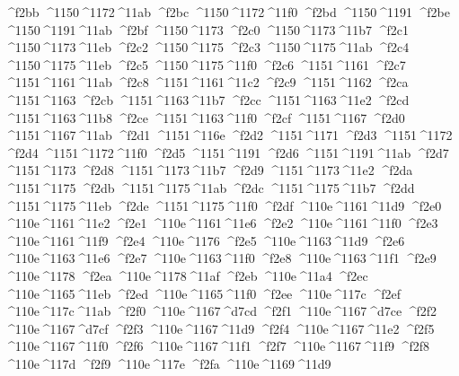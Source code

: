\checkit ^^^^f2bb ^^^^1150^^^^1172^^^^11ab
\checkit ^^^^f2bc ^^^^1150^^^^1172^^^^11f0
\checkit ^^^^f2bd ^^^^1150^^^^1191
\checkit ^^^^f2be ^^^^1150^^^^1191^^^^11ab
\checkit ^^^^f2bf ^^^^1150^^^^1173
\checkit ^^^^f2c0 ^^^^1150^^^^1173^^^^11b7
\checkit ^^^^f2c1 ^^^^1150^^^^1173^^^^11eb
\checkit ^^^^f2c2 ^^^^1150^^^^1175
\checkit ^^^^f2c3 ^^^^1150^^^^1175^^^^11ab
\checkit ^^^^f2c4 ^^^^1150^^^^1175^^^^11eb
\checkit ^^^^f2c5 ^^^^1150^^^^1175^^^^11f0
\checkit ^^^^f2c6 ^^^^1151^^^^1161
\checkit ^^^^f2c7 ^^^^1151^^^^1161^^^^11ab
\checkit ^^^^f2c8 ^^^^1151^^^^1161^^^^11c2
\checkit ^^^^f2c9 ^^^^1151^^^^1162
\checkit ^^^^f2ca ^^^^1151^^^^1163
\checkit ^^^^f2cb ^^^^1151^^^^1163^^^^11b7
\checkit ^^^^f2cc ^^^^1151^^^^1163^^^^11e2
\checkit ^^^^f2cd ^^^^1151^^^^1163^^^^11b8
\checkit ^^^^f2ce ^^^^1151^^^^1163^^^^11f0
\checkit ^^^^f2cf ^^^^1151^^^^1167
\checkit ^^^^f2d0 ^^^^1151^^^^1167^^^^11ab
\checkit ^^^^f2d1 ^^^^1151^^^^116e
\checkit ^^^^f2d2 ^^^^1151^^^^1171
\checkit ^^^^f2d3 ^^^^1151^^^^1172
\checkit ^^^^f2d4 ^^^^1151^^^^1172^^^^11f0
\checkit ^^^^f2d5 ^^^^1151^^^^1191
\checkit ^^^^f2d6 ^^^^1151^^^^1191^^^^11ab
\checkit ^^^^f2d7 ^^^^1151^^^^1173
\checkit ^^^^f2d8 ^^^^1151^^^^1173^^^^11b7
\checkit ^^^^f2d9 ^^^^1151^^^^1173^^^^11e2
\checkit ^^^^f2da ^^^^1151^^^^1175
\checkit ^^^^f2db ^^^^1151^^^^1175^^^^11ab
\checkit ^^^^f2dc ^^^^1151^^^^1175^^^^11b7
\checkit ^^^^f2dd ^^^^1151^^^^1175^^^^11eb
\checkit ^^^^f2de ^^^^1151^^^^1175^^^^11f0
\checkit ^^^^f2df ^^^^110e^^^^1161^^^^11d9
\checkit ^^^^f2e0 ^^^^110e^^^^1161^^^^11e2
\checkit ^^^^f2e1 ^^^^110e^^^^1161^^^^11e6
\checkit ^^^^f2e2 ^^^^110e^^^^1161^^^^11f0
\checkit ^^^^f2e3 ^^^^110e^^^^1161^^^^11f9
\checkit ^^^^f2e4 ^^^^110e^^^^1176
\checkit ^^^^f2e5 ^^^^110e^^^^1163^^^^11d9
\checkit ^^^^f2e6 ^^^^110e^^^^1163^^^^11e6
\checkit ^^^^f2e7 ^^^^110e^^^^1163^^^^11f0
\checkit ^^^^f2e8 ^^^^110e^^^^1163^^^^11f1
\checkit ^^^^f2e9 ^^^^110e^^^^1178
\checkit ^^^^f2ea ^^^^110e^^^^1178^^^^11af
\checkit ^^^^f2eb ^^^^110e^^^^11a4
\checkit ^^^^f2ec ^^^^110e^^^^1165^^^^11eb
\checkit ^^^^f2ed ^^^^110e^^^^1165^^^^11f0
\checkit ^^^^f2ee ^^^^110e^^^^117c
\checkit ^^^^f2ef ^^^^110e^^^^117c^^^^11ab
\checkit ^^^^f2f0 ^^^^110e^^^^1167^^^^d7cd
\checkit ^^^^f2f1 ^^^^110e^^^^1167^^^^d7ce
\checkit ^^^^f2f2 ^^^^110e^^^^1167^^^^d7cf
\checkit ^^^^f2f3 ^^^^110e^^^^1167^^^^11d9
\checkit ^^^^f2f4 ^^^^110e^^^^1167^^^^11e2
\checkit ^^^^f2f5 ^^^^110e^^^^1167^^^^11f0
\checkit ^^^^f2f6 ^^^^110e^^^^1167^^^^11f1
\checkit ^^^^f2f7 ^^^^110e^^^^1167^^^^11f9
\checkit ^^^^f2f8 ^^^^110e^^^^117d
\checkit ^^^^f2f9 ^^^^110e^^^^117e
\checkit ^^^^f2fa ^^^^110e^^^^1169^^^^11d9
